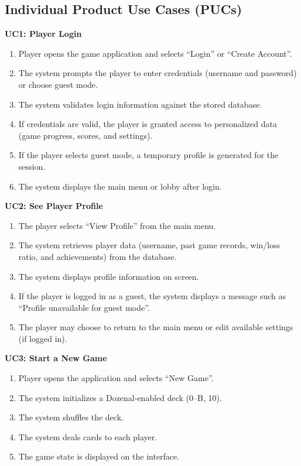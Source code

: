\documentclass[12pt]{article}
\begin{document}
\subsection{Individual Product Use Cases (PUCs)}

\noindent\textbf{UC1: Player Login}
\begin{enumerate}
    \item Player opens the game application and selects ``Login'' or ``Create Account''.
    \item The system prompts the player to enter credentials (username and password) or choose guest mode.
    \item The system validates login information against the stored database.
    \item If credentials are valid, the player is granted access to personalized data (game progress, scores, and settings).
    \item If the player selects guest mode, a temporary profile is generated for the session.
    \item The system displays the main menu or lobby after login.
\end{enumerate}

\noindent\textbf{UC2: See Player Profile}
\begin{enumerate}
    \item The player selects ``View Profile'' from the main menu.
    \item The system retrieves player data (username, past game records, win/loss ratio, and achievements) from the database.
    \item The system displays profile information on screen.
    \item If the player is logged in as a guest, the system displays a message such as ``Profile unavailable for guest mode''.
    \item The player may choose to return to the main menu or edit available settings (if logged in).
\end{enumerate}


\noindent\textbf{UC3: Start a New Game}
\begin{enumerate}
    \item Player opens the application and selects ``New Game''.
    \item The system initializes a Dozenal-enabled deck (0--B, 10).
    \item The system shuffles the deck.
    \item The system deals cards to each player.
    \item The game state is displayed on the interface.
\end{enumerate}
\end{document}
